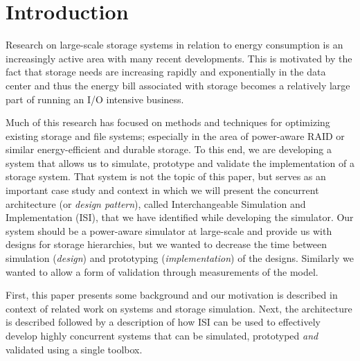 \section*{Introduction}
Research on large-scale storage systems in relation to energy consumption is
an increasingly active area with many recent developments\cite{survey-power}. This is
motivated by the fact that storage needs are increasing rapidly and
exponentially in the data center and thus the energy bill associated
with storage becomes a relatively large part of running an I/O intensive
business.

Much of this research has focused on methods and techniques for optimizing
existing storage and file systems; especially in the area of power-aware
RAID\cite{paraid} or similar energy-efficient and durable storage. To this end,
we are developing a system that allows us to simulate, prototype and validate
the implementation of a storage system.  That system is not the topic of this
paper, but serves as an important case study and context in which we will
present the concurrent architecture (or \emph{design pattern}), called
Interchangeable Simulation and Implementation (ISI), that we have identified
while developing the simulator. Our system should be a power-aware simulator at
large-scale and provide us with designs for storage hierarchies, but we wanted
to decrease the time between simulation (\emph{design}) and prototyping
(\emph{implementation}) of the designs. Similarly we wanted to allow a form of
validation through measurements of the model.

First, this paper presents some background and our motivation is described in
context of related work on systems and storage simulation. Next, the
architecture is described followed by a description of how ISI can be used to
effectively develop highly concurrent systems that can be simulated, prototyped
\emph{and} validated using a single toolbox.
